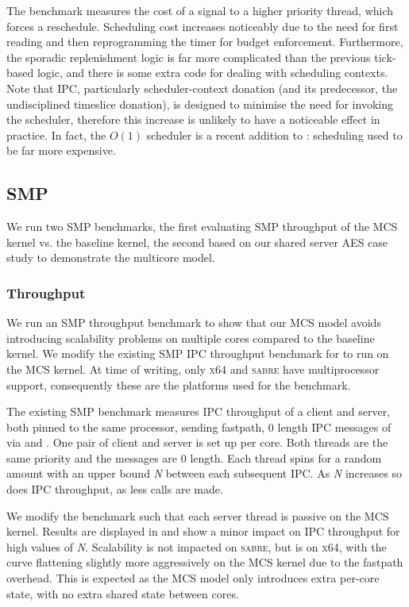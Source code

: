 The  benchmark measures the cost of a signal to a higher priority thread, which forces a reschedule.
Scheduling cost increases noticeably due to the need for first reading
and then reprogramming the timer for budget enforcement. Furthermore,
the sporadic replenishment logic is far more complicated than the
previous tick-based logic, and there is some extra code for
dealing with scheduling contexts. Note that \selfour IPC,
particularly scheduler-context donation (and its predecessor, the
undisciplined timeslice donation), is designed to minimise the need for
invoking the scheduler, therefore this increase is unlikely to have
a noticeable effect in practice. In fact, the \(O(1)\) scheduler is a
recent addition to \selfour: scheduling used to be far more expensive.



\subsection{SMP}

We run two SMP benchmarks, the first evaluating SMP throughput of the MCS kernel vs. the
baseline kernel, the second based on our shared server \gls{AES} case study to demonstrate the
multicore model. 

\subsubsection{Throughput}

We run an SMP throughput benchmark to show that our MCS model
avoids introducing scalability problems on multiple cores compared to the baseline kernel.
We modify the
existing SMP IPC throughput benchmark for \selfour to run on the MCS kernel. 
At time of writing, only \textsc{x64} and \textsc{sabre} have \selfour multiprocessor support, 
consequently these are the platforms used for the benchmark.

The existing SMP benchmark measures IPC throughput of a client and server, both 
pinned to the same processor, sending fastpath, 0 length IPC messages of via \call
and \replyrecv. One pair of client and server is set up per core. Both threads are
the same priority and the messages are 0 length. Each thread spins for a random amount
with an upper bound \textit{N} between each subsequent IPC. As \textit{N} increases so does
IPC throughput, as less calls are made.

We modify the benchmark such that each server thread is passive on the MCS kernel.
Results are displayed in  and show a minor impact on IPC throughput
for high values of \textit{N}. Scalability is not impacted on \textsc{sabre}, but is on \textsc{x64},
with the curve flattening slightly more aggressively on the MCS kernel
due to the fastpath overhead. This is expected as the MCS model only introduces extra 
per-core state, with no extra shared state between cores.

